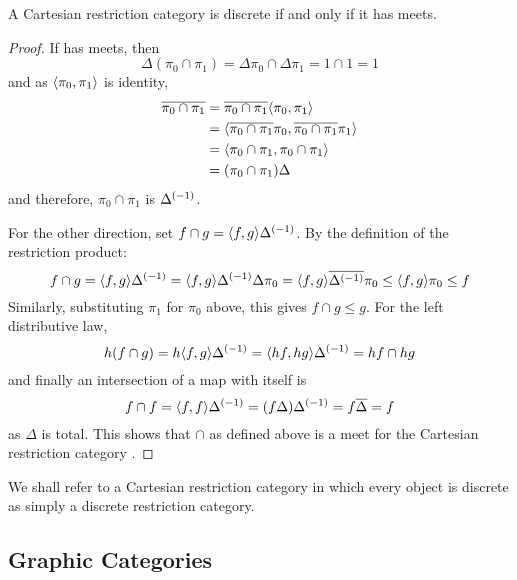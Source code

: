     \begin{theorem}\label{thm:a_crc_is_discrete_iff_it_has_meets}
      A Cartesian restriction category \X is discrete if and only if it has meets.
    \end{theorem}
    \begin{proof}
      If \X has meets, then
      \[
        \Delta(\pi_0 \cap \pi_1) = \Delta\pi_0 \cap \Delta\pi_1 = 1\cap 1 = 1
      \]
      and as $\langle\pi_0,\pi_1\rangle$ is identity,
      \begin{align*}
        \overline{\pi_0 \cap \pi_1} &= \overline{\pi_0 \cap \pi_1} \langle\pi_0, \pi_1\rangle \\
        &=\langle\overline{\pi_0 \cap \pi_1}\pi_0, \overline{\pi_0 \cap \pi_1}\pi_1\rangle\\
        &=\langle\pi_0 \cap \pi_1,\pi_0 \cap \pi_1\rangle\\
        &=(\pi_0 \cap \pi_1 )\Delta
      \end{align*}
      and therefore, $\pi_0 \cap \pi_1$ is ${\Delta}^{(-1)}$.

      For the other direction, set $f\cap g = \langle f,g\rangle{\Delta}^{(-1)}$.
      By the definition of the restriction product:
      \[
        f \cap g =  \langle f,g\rangle{\Delta}^{(-1)} =\langle f,g\rangle{\Delta}^{(-1)} \Delta \pi_0 =
          \langle f,g\rangle\overline{{\Delta}^{(-1)}}\pi_0 \le \langle f,g\rangle\pi_0 \le f
      \]
      Similarly, substituting $\pi_1$ for $\pi_0$ above, this gives $f \cap g \le g$.
      For the left distributive law,
      \[
        h(f \cap g) = h \langle f,g\rangle{\Delta}^{(-1)} =  \langle h f,h g\rangle{\Delta}^{(-1)} = h f \cap h g
      \]
      and finally an intersection of a map with itself is
      \[
        f\cap f = \langle f,f\rangle {\Delta}^{(-1)} = (f \Delta) {\Delta}^{(-1)} = f \overline{\Delta} = f 
      \]
      as $\Delta$ is total. This shows that $\cap$ as defined above is a meet for the
      Cartesian restriction category \X.

    \end{proof}

    We shall refer to a Cartesian restriction category in which every object is
    discrete as simply a discrete restriction category.

  \subsection{Graphic Categories} %
    \label{sub:graphic_categories}


